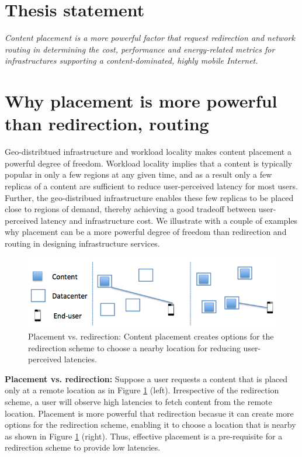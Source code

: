 \section{Thesis statement}

\emph{Content placement is a more powerful factor that request redirection and network routing in determining the cost, performance and energy-related metrics for infrastructures supporting a content-dominated, highly mobile Internet.}

\section{Why placement is more powerful than redirection, routing}

Geo-distribtued infrastructure and workload locality makes content placement a powerful degree of freedom. Workload locality implies that a content is typically popular in only a few regions at any given time, and as a result only a few replicas of a content are sufficient to reduce user-perceived latency for most users. Further, the geo-distribued infrastructure enables these few replicas to be placed close to regions of demand, thereby achieving a good tradeoff between user-perceived latency and infrastructure cost. We illustrate with a couple of examples why placement can be a more powerful degree of freedom than redirection and routing in designing infrastructure services.


\begin{figure}
	
	\centering
	\includegraphics[scale=0.5]{fig/placement-vs-redirection.png}
	\caption{Placement vs. redirection: Content placement creates options for the redirection scheme to choose a nearby location for reducing user-perceived latencies.}	
	\label{fig:placement-redirection}
\end{figure}


\textbf{Placement vs. redirection:} Suppose a user requests a content that is placed only at a remote location as in Figure \ref{fig:placement-redirection} (left). Irrespective of the redirection scheme, a user will observe high latencies to fetch content from the remote location. Placement is more powerful that redirection becasue it can create more options for the redirection scheme, enabling it to choose a location that is nearby as shown in Figure \ref{fig:placement-redirection} (right). Thus, effective placement is a pre-requisite for a redirection scheme to provide low latencies.


